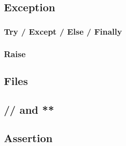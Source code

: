 \documentclass[a4paper, 12pt]{article}
\begin{document}
\subsection{Exception}
\subsubsection{Try / Except / Else / Finally}
\label{TEEF}
\subsubsection{Raise}
\label{Raise}
\subsection{Files}
\subsection{// and **}
\subsection{Assertion}
\label{subsec:Assertion}
\end{document}
